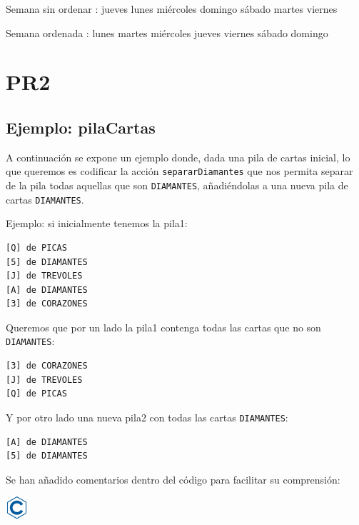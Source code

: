 \documentclass[
]{book}
\newenvironment{Shaded}{\begin{snugshade}}{\end{snugshade}}
\newcommand{\NormalTok}[1]{#1}
\begin{document}
\begin{Shaded}
\begin{Highlighting}[]
\NormalTok{Semana sin ordenar : }
\NormalTok{jueves}
\NormalTok{lunes}
\NormalTok{miércoles}
\NormalTok{domingo}
\NormalTok{sábado}
\NormalTok{martes}
\NormalTok{viernes}

\NormalTok{Semana ordenada : }
\NormalTok{lunes}
\NormalTok{martes}
\NormalTok{miércoles}
\NormalTok{jueves}
\NormalTok{viernes}
\NormalTok{sábado}
\NormalTok{domingo}
\end{Highlighting}
\end{Shaded}

\hypertarget{pr2}{%
\chapter{PR2}\label{pr2}}

\hypertarget{ejemplo-pilacartas}{%
\section{Ejemplo: pilaCartas}\label{ejemplo-pilacartas}}

A continuación se expone un ejemplo donde, dada una pila de cartas inicial, lo que queremos es codificar la acción \texttt{separarDiamantes} que nos permita separar de la pila todas aquellas que son \texttt{DIAMANTES}, añadiéndolas a una nueva pila de cartas \texttt{DIAMANTES}.

Ejemplo: si inicialmente tenemos la pila1:

\begin{verbatim}
[Q] de PICAS
[5] de DIAMANTES
[J] de TREVOLES
[A] de DIAMANTES
[3] de CORAZONES
\end{verbatim}

Queremos que por un lado la pila1 contenga todas las cartas que no son \texttt{DIAMANTES}:

\begin{verbatim}
[3] de CORAZONES
[J] de TREVOLES
[Q] de PICAS
\end{verbatim}

Y por otro lado una nueva pila2 con todas las cartas \texttt{DIAMANTES}:

\begin{verbatim}
[A] de DIAMANTES
[5] de DIAMANTES
\end{verbatim}

Se han añadido comentarios dentro del código para facilitar su comprensión:

\includegraphics{./img/c.png}
\end{document}
